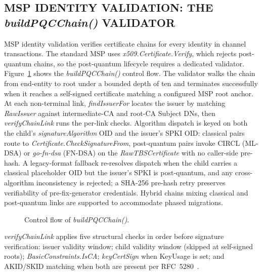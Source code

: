 \documentclass{ieeetj}
\begin{document}
\subsection{MSP IDENTITY VALIDATION: THE \textit{buildPQCChain()} VALIDATOR}
\label{sec:method_msp}

MSP identity validation verifies certificate chains for every identity
in channel transactions. The standard MSP uses
\textit{x509.Certificate.Verify}, which rejects post-quantum chains, so
the post-quantum lifecycle requires a dedicated validator.
Figure~\ref{fig:buildpqcchain_flowchart} shows the
\textit{buildPQCChain()} control flow. The validator walks the chain
from end-entity to root under a bounded depth of ten and terminates
successfully when it reaches a self-signed certificate matching a
configured MSP root anchor. At each non-terminal link,
\textit{findIssuerFor} locates the issuer by matching \textit{RawIssuer}
against intermediate-CA and root-CA Subject DNs, then
\textit{verifyChainLink} runs the per-link checks. Algorithm dispatch is
keyed on both the child's \textit{signatureAlgorithm} OID and the
issuer's SPKI OID: classical pairs route to
\textit{Certificate.CheckSignatureFrom}, post-quantum pairs invoke CIRCL
(ML-DSA) or \textit{go-fn-dsa} (FN-DSA) on the
\textit{RawTBSCertificate} with no caller-side pre-hash. A legacy-format
fallback re-resolves dispatch when the child carries a classical
placeholder OID but the issuer's SPKI is post-quantum, and any
cross-algorithm inconsistency is rejected; a SHA-256 pre-hash retry
preserves verifiability of pre-fix-generator credentials. Hybrid chains
mixing classical and post-quantum links are supported to accommodate
phased migrations.

\begin{figure}[!t]
\centering

\caption{Control flow of \textit{buildPQCChain()}.}
\label{fig:buildpqcchain_flowchart}
\end{figure}

\textit{verifyChainLink} applies five structural checks in order before
signature verification: issuer validity window; child validity window
(skipped at self-signed roots); \textit{BasicConstraints.IsCA};
\textit{keyCertSign} when KeyUsage is set; and AKID/SKID matching when
both are present per RFC~5280~\cite{rfc5280}.
\end{document}

